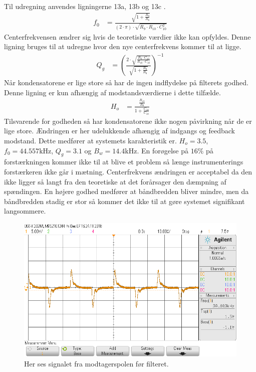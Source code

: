 Til udregning anvendes ligningerne 13a, 13b og 13c \cite[Side. 208]{Huelsman1993}. 
\begin{align}
	f_0 & = \frac{\sqrt{1+\frac{R_9}{R_8}}}{\left( 2 \cdot \pi \right) \cdot \sqrt{R_9 \cdot R_{10} \cdot C_{10}^2}}
	\end{align}
Centerfrekvensen ændrer sig hvis de teoretiske værdier ikke kan opfyldes. Denne ligning bruges til at udregne hvor den nye centerfrekvens kommer til at ligge.
\begin{align}
	Q_g & = \left( \frac{2 \cdot \sqrt{\frac{R_9 \cdot C_{10}}{R_{10} \cdot C_{10}}}}{\sqrt{1+\frac{R_9}{R_8}}} \right)^{-1}
	\end{align}
Når kondensatorene er lige store så har de ingen indflydelse på filterets godhed. Denne ligning er kun afhængig af modstandsværdierne i dette tilfælde.
\begin{align}
	H_o & = \frac{\frac{R_{10}}{R_8}}{1+\frac{C_{10}}{C_{10}}}
\end{align}
Tilsvarende for godheden så har kondensatorene ikke nogen påvirkning når de er lige store.
Ændringen er her udelukkende afhængig af indgangs og feedback modstand.
Dette medfører at systemets karakteristik er. 
$H_o = 3.5$, $f_0 = 44.557 \si{\kilo\hertz}$, $Q_g = 3.1$ og $B_w = 14.4 \si{\kilo\hertz}$. 
En forøgelse på $16 \%$ på forstærkningen kommer ikke til at blive et problem så længe instrumenterings forstærkeren ikke går i mætning. 
Centerfrekvens ændringen er acceptabel da den ikke ligger så langt fra den teoretiske at det forårsager den dæmpning af spændingen.
En højere godhed medfører at båndbredden bliver mindre, men da båndbredden stadig er stor så kommer det ikke til at gøre systemet signifikant langsommere.

\begin{figure}[h!]
	\centering
	\includegraphics[width=1\textwidth]{billeder/filter_in_png.png}
	\caption{Her ses signalet fra modtagerspolen før filteret.}
	\label{fig:filter_in}
\end{figure}

